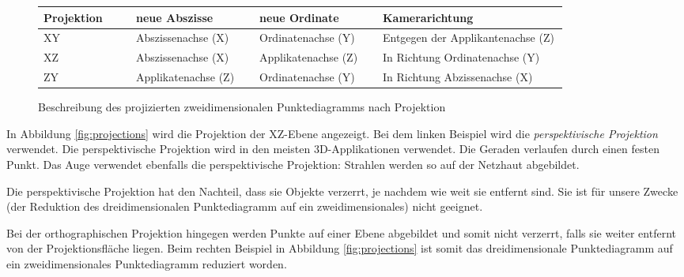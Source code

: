 \begin{figure}[H]
	\centering
	\begin{tabular}{ | m{0.15\linewidth} | m{0.2\linewidth} |m{0.2\linewidth} | m{0.3\linewidth} |}
		\hline
		\textbf{Projektion} & \textbf{neue Abszisse} & \textbf{neue Ordinate} & \textbf{Kamerarichtung}\\ \hline
		XY & Abszissenachse (X) & Ordinatenachse (Y) & Entgegen der Applikantenachse (Z) \\ \hline
		XZ & Abszissenachse (X) & Applikatenachse (Z) & In Richtung Ordinatenachse (Y)\\ \hline
		ZY & Applikatenachse (Z) & Ordinatenachse (Y) & In Richtung Abzissenachse (X) \\ \hline
	\end{tabular}
	\caption{Beschreibung des projizierten zweidimensionalen Punktediagramms nach Projektion}
	\label{fig:3dtable}
\end{figure}

In Abbildung \ref{fig:projections} wird die Projektion der XZ-Ebene angezeigt. Bei dem linken Beispiel wird die \textit{perspektivische Projektion} verwendet. Die perspektivische Projektion wird in den meisten 3D-Applikationen verwendet. Die Geraden verlaufen durch einen festen Punkt. Das Auge verwendet ebenfalls die perspektivische Projektion: Strahlen werden so auf der Netzhaut abgebildet.

Die perspektivische Projektion hat den Nachteil, dass sie Objekte verzerrt, je nachdem wie weit sie entfernt sind. Sie ist für unsere Zwecke (der Reduktion des dreidimensionalen Punktediagramm auf ein zweidimensionales) nicht geeignet.

Bei der orthographischen Projektion hingegen werden Punkte auf einer Ebene abgebildet und somit nicht verzerrt, falls sie weiter entfernt von der Projektionsfläche liegen. Beim rechten Beispiel in Abbildung \ref{fig:projections} ist somit das dreidimensionale Punktediagramm auf ein zweidimensionales Punktediagramm reduziert worden.

